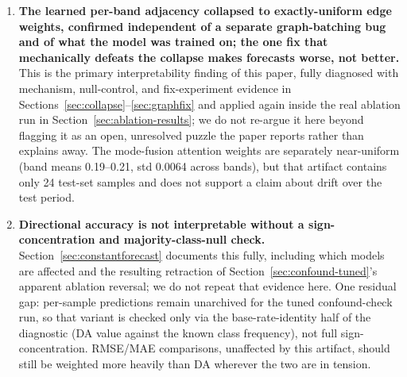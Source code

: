 \documentclass[journal]{IEEEtran}
\begin{document}
\begin{enumerate}
    \item \textbf{The learned per-band adjacency collapsed to exactly-uniform edge weights, confirmed independent of a separate graph-batching bug and of what the model was trained on; the one fix that mechanically defeats the collapse makes forecasts worse, not better.} This is the primary interpretability finding of this paper, fully diagnosed with mechanism, null-control, and fix-experiment evidence in Sections~\ref{sec:collapse}--\ref{sec:graphfix} and applied again inside the real ablation run in Section~\ref{sec:ablation-results}; we do not re-argue it here beyond flagging it as an open, unresolved puzzle the paper reports rather than explains away. The mode-fusion attention weights are separately near-uniform (band means 0.19--0.21, std 0.0064 across bands), but that artifact contains only 24 test-set samples and does not support a claim about drift over the test period.
    \item \textbf{Directional accuracy is not interpretable without a sign-concentration and majority-class-null check.} Section~\ref{sec:constantforecast} documents this fully, including which models are affected and the resulting retraction of Section~\ref{sec:confound-tuned}'s apparent ablation reversal; we do not repeat that evidence here. One residual gap: per-sample predictions remain unarchived for the tuned confound-check run, so that variant is checked only via the base-rate-identity half of the diagnostic (DA value against the known class frequency), not full sign-concentration. RMSE/MAE comparisons, unaffected by this artifact, should still be weighted more heavily than DA wherever the two are in tension.

\end{enumerate}
\end{document}
